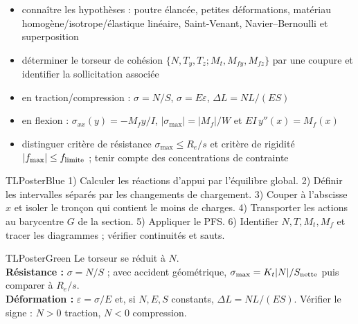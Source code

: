 \documentclass[10pt,a3paper]{article}
\begin{document}
\vspace{2mm}
\begin{minipage}[t]{0.61\linewidth}
\begin{TLPosterSavoirs}
\begin{itemize}
  \item connaître les hypothèses : poutre élancée, petites déformations, matériau homogène/isotrope/élastique linéaire, Saint-Venant, Navier--Bernoulli et superposition
  \item déterminer le torseur de cohésion $\{N,T_y,T_z;M_t,M_{fy},M_{fz}\}$ par une coupure et identifier la sollicitation associée
  \item en traction/compression : $\sigma=N/S$, $\sigma=E\varepsilon$, $\Delta L=NL/(ES)$
  \item en flexion : $\sigma_{xx}(y)=-M_fy/I$, $|\sigma_{\max}|=|M_f|/W$ et $EI\,y''(x)=M_f(x)$
  \item distinguer critère de résistance $\sigma_{\max}\le R_e/s$ et critère de rigidité $|f_{\max}|\le f_{\rm limite}$ ; tenir compte des concentrations de contrainte
\end{itemize}
\end{TLPosterSavoirs}
\end{minipage}\hfill
\begin{minipage}[t]{0.36\linewidth}
\end{minipage}
\vfill
\begin{minipage}[t]{0.49\linewidth}
\begin{TLPosterBloc}{TLPosterBlue}
1) Calculer les réactions d'appui par l'équilibre global. 2) Définir les intervalles séparés par les changements de chargement. 3) Couper à l'abscisse $x$ et isoler le tronçon qui contient le moins de charges. 4) Transporter les actions au barycentre $G$ de la section. 5) Appliquer le PFS. 6) Identifier $N,T,M_t,M_f$ et tracer les diagrammes ; vérifier continuités et sauts.
\end{TLPosterBloc}
\begin{TLPosterBloc}{TLPosterGreen}
Le torseur se réduit à $N$.\\
\textbf{Résistance :} $\sigma=N/S$ ; avec accident géométrique, $\sigma_{\max}=K_t|N|/S_{\rm nette}$ puis comparer à $R_e/s$.\\
\textbf{Déformation :} $\varepsilon=\sigma/E$ et, si $N,E,S$ constants, $\Delta L=NL/(ES)$. Vérifier le signe : $N>0$ traction, $N<0$ compression.
\end{TLPosterBloc}
\end{minipage}\hfill
\end{document}
